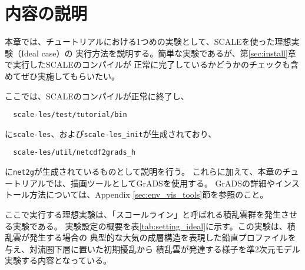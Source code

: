 

\section{内容の説明}

本章では、チュートリアルにおける1つめの実験として、SCALEを使った理想実験（Ideal case）の
実行方法を説明する。簡単な実験であるが、第\ref{sec:install}章で実行したSCALEのコンパイルが
正常に完了しているかどうかのチェックも含めてぜひ実施してもらいたい。

ここでは、SCALEのコンパイルが正常に終了し、
\begin{verbatim}
  scale-les/test/tutorial/bin
\end{verbatim}
に\verb|scale-les|、および\verb|scale-les_init|が生成されており、
\begin{verbatim}
  scale-les/util/netcdf2grads_h
\end{verbatim}
に\verb|net2g|が生成されているものとして説明を行う。
これらに加えて、本章のチュートリアルでは、描画ツールとしてGrADSを使用する。
GrADSの詳細やインストール方法については、Appendix \ref{sec:env_vis_tools}節を参照のこと。


ここで実行する理想実験は、「スコールライン」と呼ばれる積乱雲群を発生させる実験である。
実験設定の概要を表\ref{tab:setting_ideal}に示す。この実験は、積乱雲が発生する場合の
典型的な大気の成層構造を表現した鉛直プロファイルを与え、対流圏下層に置いた初期擾乱から
積乱雲が発達する様子を準2次元モデル実験する内容となっている。

